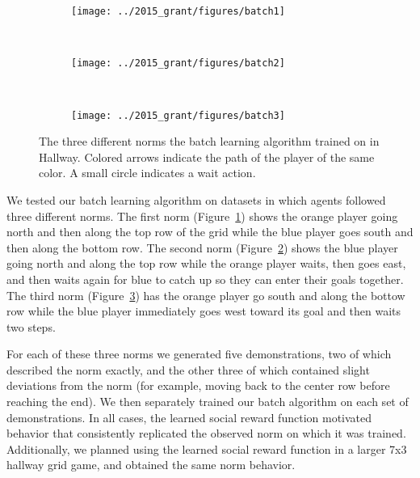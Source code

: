 
\begin{figure}
    \centering
    \begin{subfigure}[b]{0.275\textwidth}
        \texttt{[image: ../2015\_grant/figures/batch1]}
        \caption{}
        \label{fig:batch1}
    \end{subfigure}
\qquad
    ~ %
    \begin{subfigure}[b]{0.275\textwidth}
        \texttt{[image: ../2015\_grant/figures/batch2]}
        \caption{}
        \label{fig:batch2}
    \end{subfigure}
\qquad
    ~ %
    \begin{subfigure}[b]{0.275\textwidth}
        \texttt{[image: ../2015\_grant/figures/batch3]}
        \caption{}
        \label{fig:batch3}
    \end{subfigure}
    \caption{The three different norms the batch learning algorithm trained on in Hallway. Colored arrows indicate the path of the player of the same color. A small circle indicates a wait action.}\label{fig:batchRes}
\end{figure}

We tested our batch learning algorithm on datasets in which
agents followed three different norms. 
The first norm (Figure~\ref{fig:batch1}) shows the orange player going
north and then along the top row of the grid while the blue player
goes south and then along the bottom row. The second norm
(Figure~\ref{fig:batch2}) shows the blue player going north and along
the top row while the orange player waits, then goes east, and then
waits again for blue to catch up so they can enter their goals
together.  The third norm (Figure~\ref{fig:batch3}) has the orange
player go south and along the bottow row while the blue player
immediately goes west toward its goal and then waits two steps.

For each of these three norms we generated five demonstrations, two of
which described the norm exactly, and the other three of which
contained slight deviations from the norm (for example, moving back to
the center row before reaching the end). We then
separately trained our batch algorithm on each set of demonstrations.
In all cases, the learned social reward function motivated
behavior that consistently replicated the observed norm on which it
was trained. Additionally, we planned using the learned social reward
function in a larger 7x3 hallway grid game, and obtained the same norm
behavior.

